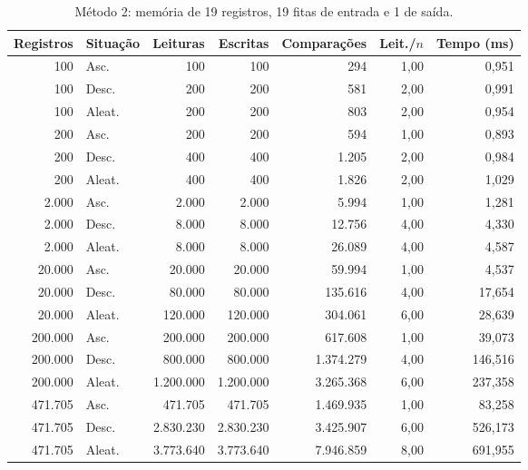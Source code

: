 \documentclass{article}
\begin{document}
\begin{table}[!htb]
    \centering
    \small
    \begin{tabular}{|r|l|r|r|r|r|r|}
        \hline\hline
        Registros & Situação & Leituras & Escritas & Comparações & Leit./$n$ & Tempo (ms) \\\hline
        100      & Asc.   &        100 &        100 &         294 &  1,00 &     0,951 \\
        100      & Desc.  &        200 &        200 &         581 &  2,00 &     0,991 \\
        100      & Aleat. &        200 &        200 &         803 &  2,00 &     0,954 \\\hline
        200      & Asc.   &        200 &        200 &         594 &  1,00 &     0,893 \\
        200      & Desc.  &        400 &        400 &       1.205 &  2,00 &     0,984 \\
        200      & Aleat. &        400 &        400 &       1.826 &  2,00 &     1,029 \\\hline
        2.000    & Asc.   &      2.000 &      2.000 &       5.994 &  1,00 &     1,281 \\
        2.000    & Desc.  &      8.000 &      8.000 &      12.756 &  4,00 &     4,330 \\
        2.000    & Aleat. &      8.000 &      8.000 &      26.089 &  4,00 &     4,587 \\\hline
        20.000   & Asc.   &     20.000 &     20.000 &      59.994 &  1,00 &     4,537 \\
        20.000   & Desc.  &     80.000 &     80.000 &     135.616 &  4,00 &    17,654 \\
        20.000   & Aleat. &    120.000 &    120.000 &     304.061 &  6,00 &    28,639 \\\hline
        200.000  & Asc.   &    200.000 &    200.000 &     617.608 &  1,00 &    39,073 \\
        200.000  & Desc.  &    800.000 &    800.000 &   1.374.279 &  4,00 &   146,516 \\
        200.000  & Aleat. &  1.200.000 &  1.200.000 &   3.265.368 &  6,00 &   237,358 \\\hline
        471.705  & Asc.   &    471.705 &    471.705 &   1.469.935 &  1,00 &    83,258 \\
        471.705  & Desc.  &  2.830.230 &  2.830.230 &   3.425.907 &  6,00 &   526,173 \\
        471.705  & Aleat. &  3.773.640 &  3.773.640 &   7.946.859 &  8,00 &   691,955 \\\hline
        \hline
    \end{tabular}
    \caption{\label{tab:m2}Método 2: memória de 19 registros, 19 fitas de entrada e 1 de saída.}
\end{table}
\end{document}

